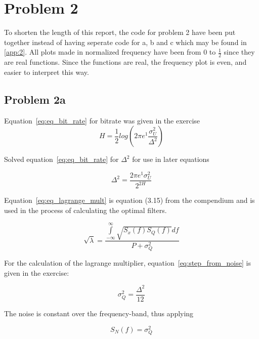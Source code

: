 \chapter{Problem 2}
To shorten the length of this report, the code for problem 2 have been put together instead of having seperate code for a, b and c which may be found in \ref{app:2}. All plots made in normalized frequency have been from $0$ to $\frac{1}{2}$ since they are real functions. Since the functions are real, the frequency plot is even, and easier to interpret this way.
                          
\section{Problem 2a}
	
	
	Equation~\ref{eq:eq_bit_rate} for bitrate was given in the exercise 
	\begin{equation}
		H=\frac{1}{2}log(2\pi e^1\frac{\sigma ^2 _U}{\Delta ^2})
		\label{eq:eq_bit_rate}
	\end{equation}
	
	Solved equation~\ref{eq:eq_bit_rate} for $\Delta ^2$ for use in later equations
	
	\begin{equation}
		\Delta ^2=\frac{2\pi e^1\sigma ^2 _U}{2^{2H}}
		\label{eq:step_size}
	\end{equation}
	
	Equation~\ref{eq:eq_lagrange_mult} is equation (3.15) from the compendium and is used in the process of calculating the optimal filters.
	
	\begin{equation}
		\sqrt{\lambda}=\frac{\int\limits_{-\infty}^{\infty}\sqrt{S_x(f)S_Q(f)}df}{P+\sigma^2_Q}
		\label{eq:eq_lagrange_mult}
	\end{equation}
	
	For the calculation of the lagrange multiplier, equation~\ref{eq:step_from_noise} is given in the exercise:
	
	\begin{equation}
		\sigma^2_Q=\frac{\Delta^2}{12}
		\label{eq:step_from_noise}
	\end{equation}
	
	The noise is constant over the frequency-band, thus applying
	
	\begin{equation*}
		S_N(f)=\sigma^2_Q
	\end{equation*}
	

